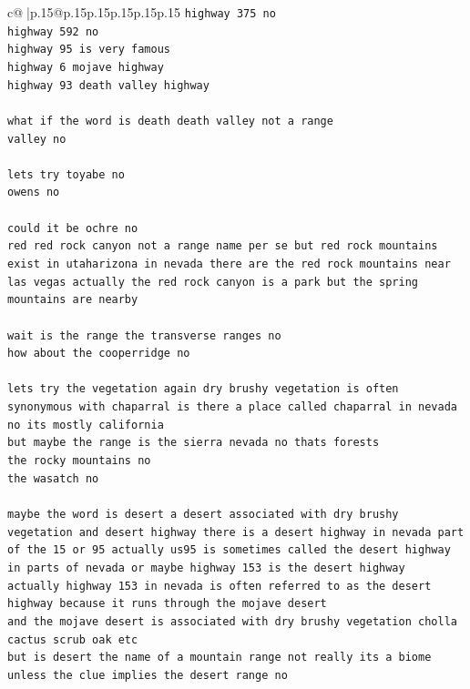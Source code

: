 \documentclass{article}
\begin{document}
{\begin{supertabular}{c@{$\;$}|p{.15\linewidth}@{}p{.15\linewidth}p{.15\linewidth}p{.15\linewidth}p{.15\linewidth}p{.15\linewidth}}
{{{\texttt{highway 375 no} \\
\texttt{highway 592 no} \\
\texttt{highway 95 is very famous} \\
\texttt{highway 6 mojave highway} \\
\texttt{highway 93 death valley highway} \\
\\ 
\texttt{what if the word is death death valley not a range} \\
\texttt{valley no} \\
\\ 
\texttt{lets try toyabe no} \\
\texttt{owens no} \\
\\ 
\texttt{could it be ochre no} \\
\texttt{red red rock canyon not a range name per se but red rock mountains exist in utaharizona in nevada there are the red rock mountains near las vegas actually the red rock canyon is a park but the spring mountains are nearby} \\
\\ 
\texttt{wait is the range the transverse ranges no} \\
\texttt{how about the cooperridge no} \\
\\ 
\texttt{lets try the vegetation again dry brushy vegetation is often synonymous with chaparral is there a place called chaparral in nevada no its mostly california} \\
\texttt{but maybe the range is the sierra nevada no thats forests} \\
\texttt{the rocky mountains no} \\
\texttt{the wasatch no} \\
\\ 
\texttt{maybe the word is desert a desert associated with dry brushy vegetation and desert highway there is a desert highway in nevada part of the 15 or 95 actually us95 is sometimes called the desert highway in parts of nevada or maybe highway 153 is the desert highway} \\
\texttt{actually highway 153 in nevada is often referred to as the desert highway because it runs through the mojave desert} \\
\texttt{and the mojave desert is associated with dry brushy vegetation cholla cactus scrub oak etc} \\
\texttt{but is desert the name of a mountain range not really its a biome unless the clue implies the desert range no} \\
}}}
\end{supertabular}}
\end{document}

